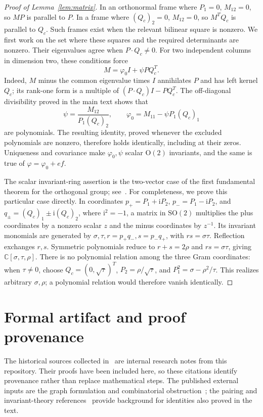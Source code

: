 \documentclass[11pt]{article}
\theoremstyle{definition}
\theoremstyle{plain}
\numberwithin{equation}{section}
\begin{document}
\begin{proof}[Proof of Lemma~\ref{lem:matrix}]
In an orthonormal frame where \(P_1=0\), \(M_{12}=0\), so \(MP\) is parallel
to \(P\). In a frame where \((Q_c)_2=0\), \(M_{12}=0\), so \(M^TQ_c\) is
parallel to \(Q_c\). Such frames exist when the relevant bilinear square is nonzero. We first
work on the set where these squares and the required determinants are nonzero. Their eigenvalues agree when \(P\cdot Q_c\ne0\). For two independent
columns in dimension two, these conditions force
\[
 M=\varphi_0I+\psi PQ_c^T.
\]
Indeed, \(M\) minus the common eigenvalue times \(I\) annihilates \(P\) and
has left kernel \(Q_c\); its rank-one form is a multiple of
\((P\cdot Q_c)I-PQ_c^T\). The off-diagonal divisibility proved in the main text shows that
\[
 \psi=\frac{M_{12}}{P_1(Q_c)_2},\qquad \varphi_0=M_{11}-\psi P_1(Q_c)_1
\]
are polynomials. The resulting identity, proved whenever the excluded
polynomials are nonzero, therefore holds identically, including at their zeros.
Uniqueness and covariance make \(\varphi_0,\psi\) scalar \(\mathrm O(2)\) invariants,
and the same is true of \(\varphi=\varphi_0+ef\).

The scalar invariant-ring assertion is the two-vector case of the first
fundamental theorem for the orthogonal group; see~\cite[Section~10.2(a)]{kraft}.
For completeness, we prove this particular case directly. In coordinates
\(p_+=P_1+\mathrm iP_2\), \(p_-=P_1-\mathrm iP_2\), and
\(q_\pm=(Q_c)_1\pm\mathrm i(Q_c)_2\), where \(\mathrm i^2=-1\),
a matrix in \(\mathrm{SO}(2)\) multiplies the plus coordinates by a
nonzero scalar \(z\) and the minus coordinates by \(z^{-1}\). Its invariant monomials
are generated by \(\sigma,\tau,r=p_+q_-,s=p_-q_+\), with
\(rs=\sigma\tau\). Reflection exchanges \(r,s\). Symmetric polynomials
reduce to \(r+s=2\rho\) and \(rs=\sigma\tau\), giving
\(\mathbb C[\sigma,\tau,\rho]\). There is no polynomial relation among the three Gram coordinates:
when \(\tau\ne0\), choose \(Q_c=(0,\sqrt\tau)^T\),
\(P_2=\rho/\sqrt\tau\), and \(P_1^2=\sigma-\rho^2/\tau\).
This realizes arbitrary \(\sigma,\rho\); a polynomial relation would
therefore vanish identically.
\end{proof}

\section{Formal artifact and proof provenance}\label{app:formal}

The historical sources collected in~\cite{review}
are internal research notes from this repository. Their proofs have been
included here, so these citations identify provenance rather than replace
mathematical steps. The published external inputs are the graph formulation
and combinatorial obstruction~\cite{kgs,cgi}; the pairing and invariant-theory
references~\cite{isserlis,kraft} provide background for identities also proved
in the text.
\end{document}
